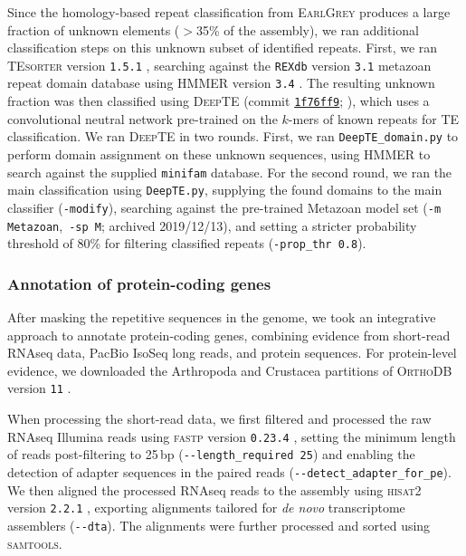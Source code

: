 Since the homology-based repeat classification from \textsc{EarlGrey} produces a large
fraction of unknown elements ($>$35\% of the assembly), we ran additional classification
steps on this unknown subset of identified repeats.
First, we ran \textsc{TEsorter} version \texttt{1.5.1} \citep{zhang_tesorter_2022},
searching against the \texttt{REXdb} version \texttt{3.1} metazoan repeat domain
database \citep{neumann_rexdb_2019} using \textsc{HMMER} version \texttt{3.4}
\citep{eddy_hmmer_2011}.
The resulting unknown fraction was then classified using \textsc{DeepTE} (commit
\href{https://github.com/LiLabAtVT/DeepTE/commit/1f76ff9da6e1dbfbb771868cdd0e149ec41457a2}{\texttt{1f76ff9}};
\citealp{yan_deepte_2020}), which uses a convolutional neutral network pre-trained on
the $k$-mers of known repeats for TE classification.
We ran \textsc{DeepTE} in two rounds.
First, we ran \texttt{DeepTE\_domain.py} to perform domain assignment on these unknown
sequences, using \textsc{HMMER} to search against the supplied \texttt{minifam} database.
For the second round, we ran the main classification using \texttt{DeepTE.py},
supplying the found domains to the main classifier (\texttt{-modify}), searching against
the pre-trained Metazoan model set (\texttt{-m Metazoan},~\texttt{-sp M}; archived
2019/12/13), and setting a stricter probability threshold of 80\% for filtering
classified repeats (\texttt{-prop\_thr 0.8}).

\subsubsection*{Annotation of protein-coding genes}\label{sec:methods_protein_coding}

After masking the repetitive sequences in the genome, we took an integrative approach to
annotate protein-coding genes, combining evidence from short-read RNAseq data, PacBio
IsoSeq long reads, and protein sequences. For protein-level evidence, we downloaded the
Arthropoda and Crustacea partitions of \textsc{OrthoDB} version \texttt{11}
\citep{kriventseva_orthodb_2019,zdobnov_orthodb_2021}.
\vspace{0.1cm}

When processing the short-read data, we first filtered and processed the raw RNAseq
Illumina reads using \textsc{fastp} version \texttt{0.23.4} \citep{chen_fastp_2018,
chen_ultrafast_2023}, setting the minimum length of reads post-filtering to 25\,bp
(\texttt{-{}-length\_required 25}) and enabling the detection of adapter sequences in the
paired reads (\texttt{-{}-detect\_adapter\_for\_pe}). We then aligned the processed RNAseq
reads to the \bgla{} assembly using \textsc{hisat2} version \texttt{2.2.1}
\citep{kim_graph-based_2019}, exporting alignments tailored for \textit{de novo}
transcriptome assemblers (\texttt{-{}-dta}). The alignments were further processed and
sorted using \textsc{samtools}.
\vspace{0.1cm}


